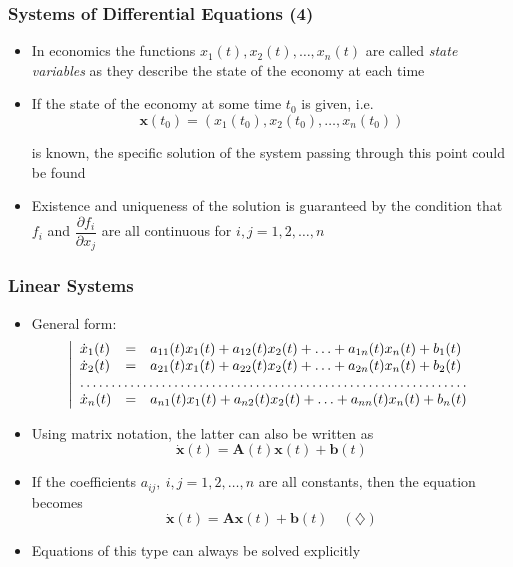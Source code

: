 \documentclass[10pt,usenames,dvipsnames]{beamer}
\theoremstyle{definition}
\begin{document}
\begin{frame}[fragile]
	\frametitle{Systems of Differential Equations (4)}
	\begin{itemize}
		\item In economics the functions $ x_{1}(t), x_{2}(t), \ldots, x_{n}(t) $ are called \textit{state variables} as they describe the state of the economy at each time
		
		\item If the state of the economy at some time $ t_{0} $ is given, i.e. 
		\[
			\mathbf{x}(t_{0}) = (x_{1}(t_{0}), x_{2}(t_{0}), \ldots, x_{n}(t_{0}))
		\]
		
		is known, the specific solution of the system passing through this point could be found
		
		\item Existence and uniqueness of the solution is guaranteed by the condition that $ f_{i} $ and $ \dfrac{\partial f_{i}}{\partial x_{j}} $ are all continuous for $ i,j = 1,2,\ldots,n $
	\end{itemize}
\end{frame}

\begin{frame}[fragile]
	\frametitle{Linear Systems}
	\begin{itemize}
		\item General form:
		\[
			\left|
			\begin{array}{lcl}
				\dot{x}_{1}(t) & = & a_{11}(t)x_{1}(t) + a_{12}(t)x_{2}(t) + \ldots + a_{1n}(t)x_{n}(t) + b_{1}(t)\\
				\dot{x}_{2}(t) & = & a_{21}(t)x_{1}(t) + a_{22}(t)x_{2}(t) + \ldots + a_{2n}(t)x_{n}(t)+ b_{2}(t)\\
				\hdotsfor{3}\\
				\dot{x}_{n}(t) & = & a_{n1}(t)x_{1}(t) + a_{n2}(t)x_{2}(t) + \ldots + a_{nn}(t)x_{n}(t) + b_{n}(t)
			\end{array}\right.
		\]
		
		\item Using matrix notation, the latter can also be written as
		\[
			\dot{\mathbf{x}}(t) = \mathbf{A}(t)\mathbf{x}(t) + \mathbf{b}(t)
		\]
		
		\item If the coefficients $ a_{ij}, \ i,j = 1,2,\ldots,n $ are all constants, then the equation becomes
		\[
			\dot{\mathbf{x}}(t) = \mathbf{A}\mathbf{x}(t) + \mathbf{b}(t) \quad (\diamondsuit)
		\]
		
		\item Equations of this type can always be solved explicitly
	\end{itemize}
\end{frame}
\end{document}
